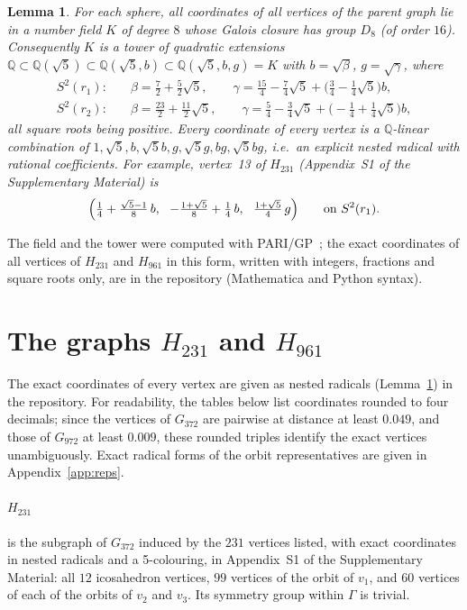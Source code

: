 \documentclass[11pt]{article}
\renewcommand{\_}{\textunderscore\allowbreak}
\newtheorem{lemma}[theorem]{Lemma}
\theoremstyle{remark}
\begin{document}
\begin{lemma}\label{rem:field}
For each sphere, all coordinates of all vertices of the parent graph lie in a number field $K$ of degree
$8$ whose Galois closure has group $D_8$ (of order $16$). Consequently $K$ is a tower of quadratic
extensions $\mathbb{Q}\subset\mathbb{Q}(\sqrt5)\subset\mathbb{Q}(\sqrt5,b)\subset\mathbb{Q}(\sqrt5,b,g)=K$
with $b=\sqrt\beta$, $g=\sqrt\gamma$, where
\begin{align*}
S^2(r_1):\quad & \beta=\tfrac72+\tfrac52\sqrt5,\qquad
\gamma=\tfrac{15}{4}-\tfrac74\sqrt5+\bigl(\tfrac34-\tfrac14\sqrt5\bigr)b,\\
S^2(r_2):\quad & \beta=\tfrac{23}{2}+\tfrac{11}{2}\sqrt5,\qquad
\gamma=\tfrac54-\tfrac34\sqrt5+\bigl(-\tfrac14+\tfrac14\sqrt5\bigr)b,
\end{align*}
all square roots being positive. Every coordinate of every vertex is a $\mathbb{Q}$-linear combination of
$1,\sqrt5,b,\sqrt5 b,g,\sqrt5 g,bg,\sqrt5 bg$, i.e.\ an explicit nested radical with rational
coefficients. For example, vertex~13 of $H_{231}$ (Appendix~S1 of the Supplementary Material) is
\[
\Bigl(\tfrac14+\tfrac{\sqrt5-1}{8}\,b,\ \ -\tfrac{1+\sqrt5}{8}+\tfrac14\,b,\ \ \tfrac{1+\sqrt5}{4}\,g\Bigr)
\qquad\text{on }S^2(r_1).
\]
\end{lemma}
The field and the tower were computed with PARI/GP~\cite{PARI}; the exact coordinates of all vertices of
$H_{231}$ and $H_{961}$ in this form, written with integers, fractions and square roots only, are in the
repository (Mathematica and Python syntax).

\section{The graphs $H_{231}$ and $H_{961}$}\label{sec:graphs}

The exact coordinates of every vertex are given as nested radicals (Lemma~\ref{rem:field}) in the
repository. For readability, the tables below list coordinates rounded to four decimals; since
the vertices of $G_{372}$ are pairwise at distance at least $0.049$, and those of $G_{972}$ at least
$0.009$, these rounded triples identify the exact vertices unambiguously. Exact radical forms of the orbit representatives are given in Appendix~\ref{app:reps}.

\paragraph{$H_{231}$} is the subgraph of $G_{372}$ induced by the $231$ vertices listed, with exact coordinates in nested radicals and a
5-colouring, in Appendix~S1 of the Supplementary Material: all $12$ icosahedron vertices, $99$ vertices of the orbit of $v_1$, and $60$
vertices of each of the orbits of $v_2$ and $v_3$. Its symmetry group within $\Gamma$ is trivial.
\end{document}
